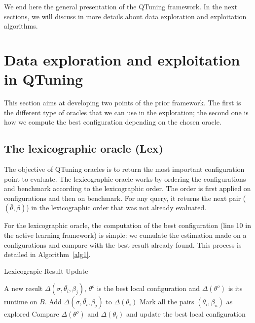 \documentclass[10pt, conference, compsocconf]{IEEEtran}
\begin{document}
We end here the general presentation of the QTuning framework. In the next sections, we will
discuss in more details about data exploration and exploitation algorithms.



\section{Data exploration and exploitation in QTuning} \label{Exploration}

This section aims at developing two points of the prior framework. The
first is the different type of oracles that we can use in the
exploration; the second one is how we compute the best configuration
depending on the chosen oracle.

\subsection{The lexicographic  oracle (Lex)}

The objective of QTuning oracles is to return the most important
configuration point to evaluate.  The lexicographic oracle works by
ordering the configurations and benchmark according to the
lexicographic order.  The order is first applied on configurations and
then on benchmark. For any query, it returns the next pair
($(\bar{\theta}, \beta)$) in the lexicographic order that was not
already evaluated.

For the lexicographic oracle, the computation of the best
configuration (line 10 in the active learning framework) is simple: we
cumulate the estimation made on a configurations and compare with the
best result already found.  This process is detailed in
Algorithm~\ref{alg1}.

	\begin{algorithm}
	\caption{\scriptsize Lexicograpic Result Update } 	\label{alg1}
	\begin{algorithmic}[1]
	\scriptsize
         A new result  $\Delta(\sigma, \bar{\theta_i}, \beta_j)$,
         $\theta^o$ is the best local configuration and $\Delta(\theta^o)$ is its runtime on $B$.
        \STATE Add $\Delta(\sigma, \bar{\theta_i}, \beta_j)$ to $\Delta(\theta_i)$
        \STATE Mark all the pairs $(\theta_i, \beta_u)$ as explored
        \ELSE
        \STATE Compare $\Delta(\theta^o)$ and $\Delta(\theta_i)$ and update the best local configuration
        \ENDIF
	\ENDIF
	\end{algorithmic}
	\end{algorithm}
	\normalsize
\end{document}
